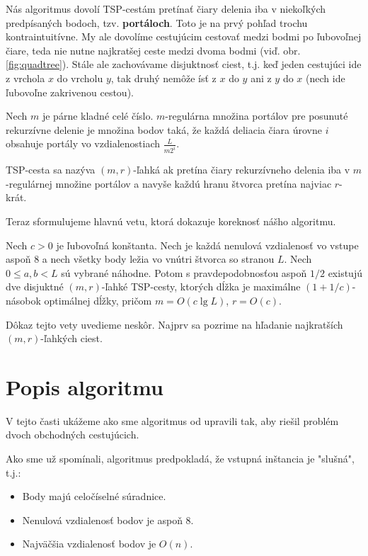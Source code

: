 Nás algoritmus dovolí TSP-cestám pretínať čiary delenia iba v niekoľkých
predpísaných bodoch, tzv. {\bf portáloch}. Toto je na prvý pohľad trochu kontraintuitívne.
My ale dovolíme cestujúcim cestovať medzi bodmi po ľubovoľnej čiare, teda nie nutne najkratšej
ceste medzi dvoma bodmi (viď. obr. \ref{fig:quadtree}). Stále ale zachovávame disjuktnosť ciest, t.j. keď
jeden cestujúci ide z vrchola $x$ do vrcholu $y$, tak druhý nemôže ísť z $x$ do $y$ ani z $y$ do
$x$ (nech ide ľubovoľne zakrivenou cestou). 

\begin{definicia}
Nech $m$ je párne kladné celé číslo. $m$-regulárna množina portálov pre posunuté rekurzívne
delenie je množina bodov taká, že každá deliacia čiara úrovne $i$ obsahuje portály vo
vzdialenostiach $\frac{L}{m2^i}$. 
\end{definicia}


\begin{definicia}
TSP-cesta sa nazýva $(m,r)$-ľahká ak pretína čiary rekurzívneho delenia iba v $m$-regulárnej
množine portálov a navyše každú hranu štvorca pretína najviac $r$-krát.
\end{definicia}

Teraz sformulujeme hlavnú vetu, ktorá dokazuje koreknosť nášho algoritmu.

\begin{veta}
Nech $c > 0$ je ľubovoľná konštanta. Nech je každá nenulová vzdialenosť vo vstupe aspoň $8$ a nech všetky
body ležia vo vnútri štvorca so stranou $L$. Nech $0 \leq a, b < L$ sú vybrané náhodne. Potom s
pravdepodobnosťou aspoň $1/2$ existujú dve disjuktné $(m,r)$-ľahké TSP-cesty, ktorých dĺžka je maximálne $(1 +
1/c)$-násobok optimálnej dĺžky, pričom $m = O(c \lg L)$, $r = O(c)$.
\end{veta}

Dôkaz tejto vety uvedieme neskôr. 
Najprv sa pozrime na hľadanie najkratších $(m, r)$-ľahkých ciest.

\section{Popis algoritmu}

V tejto časti ukážeme ako sme algoritmus od \cite{Arora} upravili tak, aby
riešil problém dvoch obchodných cestujúcich.

Ako sme už spomínali, algoritmus predpokladá, že vstupná inštancia je "slušná", t.j.:
\begin{itemize}
\item Body majú celočíselné súradnice.
\item Nenulová vzdialenosť bodov je aspoň 8.
\item Najväčšia vzdialenosť bodov je $O(n)$.
\end{itemize}

